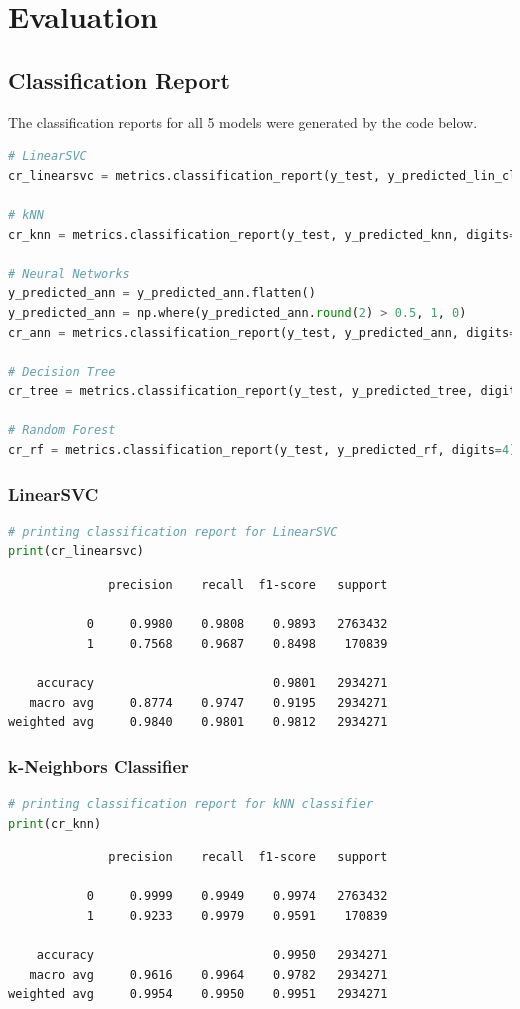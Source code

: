 \documentclass{article}
\begin{document}
\section{Evaluation}

\subsection{Classification Report}

The classification reports for all 5 models were generated by the code below.

\begin{lstlisting}[language=Python]
# LinearSVC
cr_linearsvc = metrics.classification_report(y_test, y_predicted_lin_clf, digits=4)

# kNN
cr_knn = metrics.classification_report(y_test, y_predicted_knn, digits=4)

# Neural Networks
y_predicted_ann = y_predicted_ann.flatten()
y_predicted_ann = np.where(y_predicted_ann.round(2) > 0.5, 1, 0)
cr_ann = metrics.classification_report(y_test, y_predicted_ann, digits=4)

# Decision Tree
cr_tree = metrics.classification_report(y_test, y_predicted_tree, digits=4)

# Random Forest
cr_rf = metrics.classification_report(y_test, y_predicted_rf, digits=4)
\end{lstlisting}

\subsubsection{LinearSVC}
\begin{lstlisting}[language=Python]
# printing classification report for LinearSVC
print(cr_linearsvc)
\end{lstlisting}
\begin{verbatim}  
              precision    recall  f1-score   support

           0     0.9980    0.9808    0.9893   2763432
           1     0.7568    0.9687    0.8498    170839

    accuracy                         0.9801   2934271
   macro avg     0.8774    0.9747    0.9195   2934271
weighted avg     0.9840    0.9801    0.9812   2934271
\end{verbatim}

\subsubsection{k-Neighbors Classifier}
\begin{lstlisting}[language=Python]
# printing classification report for kNN classifier
print(cr_knn)
\end{lstlisting}
\begin{verbatim}  
              precision    recall  f1-score   support

           0     0.9999    0.9949    0.9974   2763432
           1     0.9233    0.9979    0.9591    170839

    accuracy                         0.9950   2934271
   macro avg     0.9616    0.9964    0.9782   2934271
weighted avg     0.9954    0.9950    0.9951   2934271
\end{verbatim}
\end{document}
